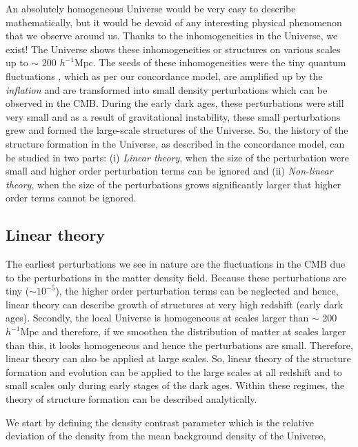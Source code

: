 An absolutely homogeneous Universe would be very easy to describe 
mathematically, but it would be devoid of any interesting physical 
phenomenon that we observe around us. Thanks to the inhomogeneities in the Universe, 
we exist! The Universe
shows these inhomogeneities or structures on various scales up to $\sim$ 
200 $h^{-1} \mathrm{Mpc}$. The seeds
of these inhomogeneities were the tiny quantum fluctuations \citep{1939Phy.....6..899S}
, which as per our concordance 
model, are amplified up by the {\it inflation} and are transformed into small density
perturbations which can be observed in the CMB. 
During the early dark ages, these perturbations were still very small and as 
a result of gravitational instability, these small perturbations 
grew and formed the large-scale structures of the Universe. 
So, the history of the  structure formation in the Universe, as described in the 
concordance model, can be studied in two parts: (i) {\it Linear theory}, when
the size of the perturbation were small and higher order perturbation terms 
can be ignored and 
(ii) {\it Non-linear theory}, when the size of the perturbations grows significantly
larger that higher order terms cannot be ignored.

\subsection{Linear theory}

The earliest perturbations we see in nature are the fluctuations in the
CMB due to the perturbations in the matter density
field. Because these perturbations are tiny ($\sim 10^{-5}$), 
the higher order perturbation
terms can be neglected and hence, linear theory can describe growth of structures
at very high redshift (early dark ages). 
Secondly, the local Universe is homogeneous at scales larger than
$\sim$ 200 $h^{-1} \mathrm{Mpc}$ and therefore, if we smoothen the distribution
of matter at scales larger than this, it looks homogeneous and hence the perturbations
are small. Therefore, linear theory can also be applied at large scales. 
So, linear theory of the structure formation and evolution can be applied
to the large scales at all redshift and to small scales only during
early stages of the dark ages. 
Within these regimes, the theory of structure formation can be
described analytically.

We start by defining the density contrast parameter which is the relative 
deviation of the density from the mean background density of the Universe,

